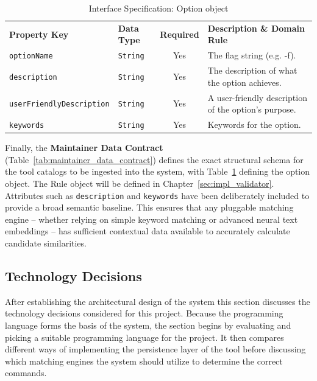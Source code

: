 \begin{table}[H]
    \centering
    \caption{Interface Specification: Option object}
    \label{tab:option_object}
    \renewcommand{\arraystretch}{1.4}
    \begin{tabularx}{\textwidth}{|l|l|c|X|}
        \hline
        \rowcolor{gray!10}
        \textbf{Property Key} & \textbf{Data Type} & \textbf{Required} & \textbf{Description \& Domain Rule} \\
        \texttt{optionName} & \texttt{String} & Yes & The flag string (e.g. -f). \\
        \hline
        \texttt{description} & \texttt{String} & Yes & The description of what the option achieves. \\
        \hline
        \texttt{userFriendlyDescription} & \texttt{String} & Yes & A user-friendly description of the option's purpose. \\
        \hline
        \texttt{keywords} & \texttt{String} & Yes & Keywords for the option. \\
        \hline
    \end{tabularx}
\end{table}
\FloatBarrier

Finally, the \textbf{Maintainer Data Contract} (Table~\ref{tab:maintainer_data_contract}) defines the exact structural schema for the tool catalogs to be ingested into the system, with Table~\ref{tab:option_object} defining the option object. The Rule object will be defined in Chapter~\ref{sec:impl_validator}. Attributes such as \texttt{description} and \texttt{keywords} have been deliberately included to provide a broad semantic baseline. This ensures that any pluggable matching engine -- whether relying on simple keyword matching or advanced neural text embeddings -- has sufficient contextual data available to accurately calculate candidate similarities.

\subsection{Technology Decisions}

After establishing the architectural design of the system this section discusses the technology decisions considered for this project. Because the programming language forms the basis of the system, the section begins by evaluating and picking a suitable programming language for the project. It then compares different ways of implementing the persistence layer of the tool before discussing which matching engines the system should utilize to determine the correct commands.

